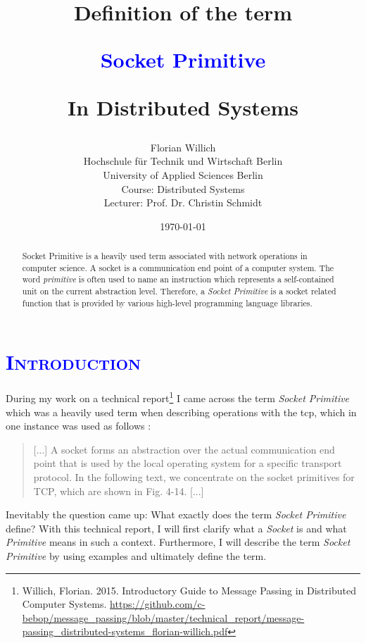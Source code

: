 \documentclass[xcolor=dvipsnames]{article}
\title{
\scshape{
\begin{large}
Definition of the term\\
\end{large}
\vspace{-4pt}
\textbf{\textcolor{blue}{Socket Primitive}}\\
\begin{large}
\vspace{-6pt}
In Distributed Systems
\end{large}
}}
\author{Florian Willich \\ Hochschule f\"ur Technik und Wirtschaft Berlin \\ University of Applied Sciences Berlin \\ Course: Distributed Systems \\ Lecturer: Prof. Dr. Christin Schmidt}
\date{\today}
\begin{document}

\begin{titlepage}

\maketitle

\begin{abstract}
Socket Primitive is a heavily used term associated with network operations in computer science. A socket is a communication end point of a computer system. The word \textit{primitive} is often used to name an instruction which represents a self-contained unit on the current abstraction level. Therefore, a \textit{Socket Primitive} is a socket related function that is provided by various high-level programming language libraries.
\end{abstract}

\end{titlepage}

\newpage

\tableofcontents

\newpage



\section{\scshape{\textcolor{blue}{Introduction}}} \label{introduction}

During my work on a technical report\footnote{Willich, Florian. 2015. Introductory Guide to Message Passing in Distributed Computer Systems. \url{https://github.com/c-bebop/message_passing/blob/master/technical_report/message-passing_distributed-systems_florian-willich.pdf}} I came across the term \textit{Socket Primitive} which was a heavily used term when describing operations with the \gls{tcp}, which in one instance was used as follows \cite[p. 141, ch. 4.3.1]{tanenbaum}:

\begin{quote}\label{tanenbaum_quote}
[...] A socket forms an abstraction over the actual communication end
point that is used by the local operating system for a specific
transport protocol. In the following text, we concentrate on the socket
primitives for TCP, which are shown in Fig. 4-14. [...] 
\end{quote}

\noindent Inevitably the question came up: What exactly does the term \textit{Socket Primitive} define?  With this technical report, I will first clarify what a \textit{Socket} is and what \textit{Primitive} means in such a context. Furthermore, I will describe the term \textit{Socket Primitive} by using examples and ultimately define the term.\\
\end{document}
